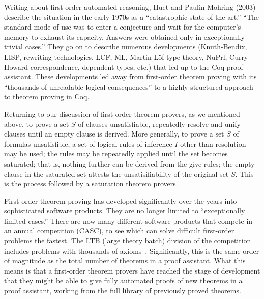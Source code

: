 \documentclass{llncs}
\begin{document}
Writing about first-order automated reasoning, Huet and Paulin-Mohring
(2003) \cite{Coq} describe the situation in the early 1970s as a
``catastrophic state of the art.''  ``The standard mode of use was to
enter a conjecture and wait for the computer's memory to exhaust its
capacity.  Answers were obtained only in exceptionally trivial
cases.'' %
They go on to describe numerous developments (Knuth-Bendix, LISP,
rewriting technologies, LCF, ML, Martin-L\"of type theory, NuPrl,
Curry-Howard correspondence, dependent types, etc.) that led up to the
Coq proof assistant.  These developments led away from first-order
theorem proving with its ``thousands of unreadable logical
consequences'' to a highly structured approach to theorem proving in Coq.


Returning to our discussion of first-order theorem provers,
as we mentioned above, to prove a set $S$ of clauses
unsatisfiable, repeatedly resolve and unify clauses until an empty
clause is derived.  More generally, to prove a set $S$ of formulas
unsatisfible, a set of logical rules of inference $I$ other than
resolution may be used; the rules may be repeatedly applied until the
set becomes saturated; that is, nothing further can be derived from
the give rules; the empty clause in the saturated set attests
the unsatisifiability of the original set $S$. 
This is the process followed by a saturation theorem provers.


First-order theorem proving has developed significantly over the years
into sophisticated software products.  They are no longer limited to
``exceptionally limited cases.''  There are now many different
software products that compete in an annual competition (CASC), to see
which can solve difficult first-order problems the fastest.  The LTB
(large theory batch) division of the competition includes problems
with thousands of axioms~\cite{PSST}.  Significantly, this is the same order of
magnitude as the total number of theorems in a proof assistant.  What
this means is that a first-order theorem provers have reached the
stage of development that they might be able to give fully automated
proofs of new theorems in a proof assistant, working from the full
library of previously proved theorems.
\end{document}
